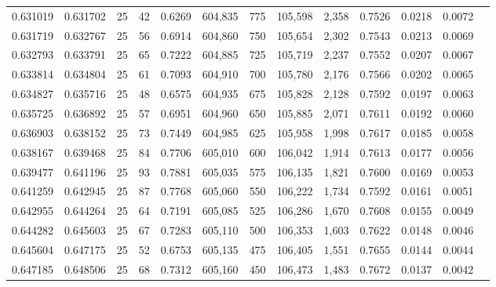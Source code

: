 \begin{tabular}{rrrrrrrrrrrrr}
0.631019 & 0.631702 &    25 &  42 &                                     0.6269 & 604,835 &     775 & 105,598 &   2,358 & 0.7526 & 0.0218 & 0.0072 \\
0.631719 & 0.632767 &    25 &  56 &                                     0.6914 & 604,860 &     750 & 105,654 &   2,302 & 0.7543 & 0.0213 & 0.0069 \\
0.632793 & 0.633791 &    25 &  65 &                                     0.7222 & 604,885 &     725 & 105,719 &   2,237 & 0.7552 & 0.0207 & 0.0067 \\
0.633814 & 0.634804 &    25 &  61 &                                     0.7093 & 604,910 &     700 & 105,780 &   2,176 & 0.7566 & 0.0202 & 0.0065 \\
0.634827 & 0.635716 &    25 &  48 &                                     0.6575 & 604,935 &     675 & 105,828 &   2,128 & 0.7592 & 0.0197 & 0.0063 \\
0.635725 & 0.636892 &    25 &  57 &                                     0.6951 & 604,960 &     650 & 105,885 &   2,071 & 0.7611 & 0.0192 & 0.0060 \\
0.636903 & 0.638152 &    25 &  73 &                                     0.7449 & 604,985 &     625 & 105,958 &   1,998 & 0.7617 & 0.0185 & 0.0058 \\
0.638167 & 0.639468 &    25 &  84 &                                     0.7706 & 605,010 &     600 & 106,042 &   1,914 & 0.7613 & 0.0177 & 0.0056 \\
0.639477 & 0.641196 &    25 &  93 &                                     0.7881 & 605,035 &     575 & 106,135 &   1,821 & 0.7600 & 0.0169 & 0.0053 \\
0.641259 & 0.642945 &    25 &  87 &                                     0.7768 & 605,060 &     550 & 106,222 &   1,734 & 0.7592 & 0.0161 & 0.0051 \\
0.642955 & 0.644264 &    25 &  64 &                                     0.7191 & 605,085 &     525 & 106,286 &   1,670 & 0.7608 & 0.0155 & 0.0049 \\
0.644282 & 0.645603 &    25 &  67 &                                     0.7283 & 605,110 &     500 & 106,353 &   1,603 & 0.7622 & 0.0148 & 0.0046 \\
0.645604 & 0.647175 &    25 &  52 &                                     0.6753 & 605,135 &     475 & 106,405 &   1,551 & 0.7655 & 0.0144 & 0.0044 \\
0.647185 & 0.648506 &    25 &  68 &                                     0.7312 & 605,160 &     450 & 106,473 &   1,483 & 0.7672 & 0.0137 & 0.0042 \\

\end{tabular}
